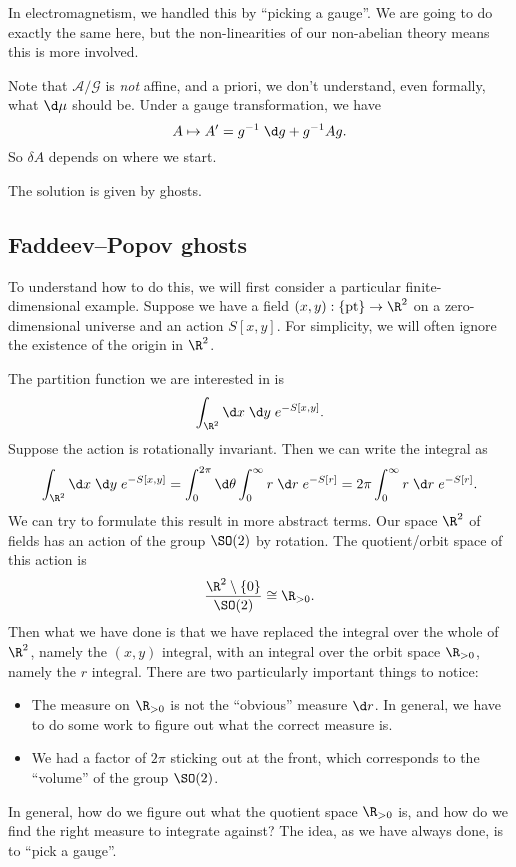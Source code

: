 \documentclass[a4paper]{article}
\begin{document}
In electromagnetism, we handled this by ``picking a gauge''. We are going to do exactly the same here, but the non-linearities of our non-abelian theory means this is more involved.

Note that $\mathcal{A}/\mathcal{G}$ is \emph{not} affine, and a priori, we don't understand, even formally, what $\d \mu$ should be. Under a gauge transformation, we have
\[
  A \mapsto A' = g^{-1}\;\d g + g^{-1} A g.
\]
So $\delta A$ depends on where we start.

The solution is given by ghosts.
\subsection{Faddeev--Popov ghosts}
To understand how to do this, we will first consider a particular finite-dimensional example. Suppose we have a field $(x, y): \{\mathrm{pt}\} \to \R^2$ on a zero-dimensional universe and an action $S[x, y]$. For simplicity, we will often ignore the existence of the origin in $\R^2$.

The partition function we are interested in is
\[
  \int_{\R^2}\d x\; \d y\; e^{-S[x, y]}.
\]
Suppose the action is rotationally invariant. Then we can write the integral as
\[
  \int_{\R^2} \d x\; \d y\; e^{-S[x, y]} = \int_0^{2\pi} \d \theta \int_0^\infty r \;\d r\; e^{-S[r]} = 2\pi \int_0^\infty r \;\d r\; e^{-S[r]}.
\]
We can try to formulate this result in more abstract terms. Our space $\R^2$ of fields has an action of the group $\SO(2)$ by rotation. The quotient/orbit space of this action is
\[
  \frac{\R^2 \setminus \{0\}}{\SO(2)} \cong \R_{> 0}.
\]
Then what we have done is that we have replaced the integral over the whole of $\R^2$, namely the $(x, y)$ integral, with an integral over the orbit space $\R_{>0}$, namely the $r$ integral. There are two particularly important things to notice:
\begin{itemize}
  \item The measure on $\R_{>0}$ is not the ``obvious'' measure $\d r$. In general, we have to do some work to figure out what the correct measure is.
  \item We had a factor of $2\pi$ sticking out at the front, which corresponds to the ``volume'' of the group $\SO(2)$.
\end{itemize}
In general, how do we figure out what the quotient space $\R_{>0}$ is, and how do we find the right measure to integrate against? The idea, as we have always done, is to ``pick a gauge''.
\end{document}
